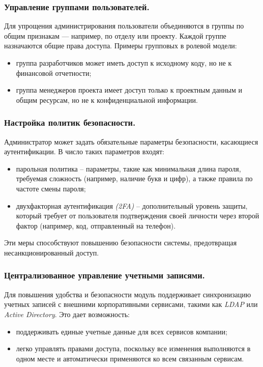 \subsubsection{Управление группами пользователей.}
Для упрощения администрирования пользователи объединяются в группы по общим признакам — например, по отделу или проекту. Каждой группе назначаются общие права доступа. Примеры групповых в ролевой модели:
\begin{itemize}
    \item группа разработчиков может иметь доступ к исходному коду, но не к финансовой отчетности;
    \item группа менеджеров проекта имеет доступ только к проектным данным и общим ресурсам, но не к конфиденциальной информации.
\end{itemize}

\subsubsection{Настройка политик безопасности.}
Администратор может задать обязательные параметры безопасности, касающиеся аутентификации. В число таких параметров входят:
\begin{itemize}
    \item парольная политика -- параметры, такие как минимальная длина пароля, требуемая сложность (например, наличие букв и цифр), а также правила по частоте смены пароля;
    \item двухфакторная аутентификация \textit{(2FA)} -- дополнительный уровень защиты, который требует от пользователя подтверждения своей личности через второй фактор (например, код, отправленный на телефон).
\end{itemize}

Эти меры способствуют повышению безопасности системы, предотвращая несанкционированный доступ.

\subsubsection{Централизованное управление учетными записями.}
Для повышения удобства и безопасности модуль поддерживает синхронизацию учетных записей с внешними корпоративными сервисами, такими как \textit{LDAP} или \textit{Active Directory}. Это дает возможность:
\begin{itemize}
    \item поддерживать единые учетные данные для всех сервисов компании;
    \item легко управлять правами доступа, поскольку все изменения выполняются в одном месте и автоматически применяются ко всем связанным сервисам.
\end{itemize}

